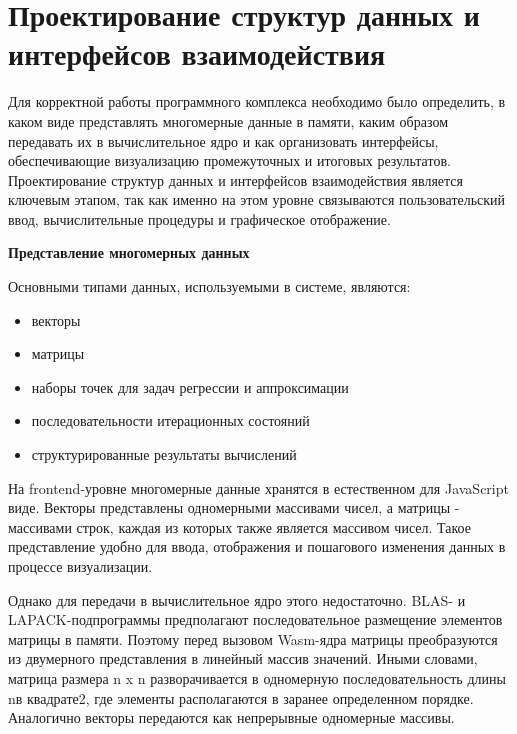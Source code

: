 \documentclass[12pt, oneside]{book}
\begin{document}
\section{Проектирование структур данных и интерфейсов взаимодействия}

    \quad Для корректной работы программного комплекса необходимо было определить, в каком виде представлять многомерные данные в памяти, каким образом передавать их в вычислительное ядро и как организовать интерфейсы, обеспечивающие визуализацию промежуточных и итоговых результатов. Проектирование структур данных и интерфейсов взаимодействия является ключевым этапом, так как именно на этом уровне связываются пользовательский ввод, вычислительные процедуры и графическое отображение.

    \vspace{0.5em}

    \textbf{\large Представление многомерных данных}

    \vspace{0.5em}

    
    \quad Основными типами данных, используемыми в системе, являются:
    
    \begin{itemize}
        \item векторы
        \item матрицы
        \item наборы точек для задач регрессии и аппроксимации
        \item последовательности итерационных состояний
        \item структурированные результаты вычислений
    \end{itemize}

    \quad На frontend-уровне многомерные данные хранятся в естественном для JavaScript виде. Векторы представлены одномерными массивами чисел, а матрицы - массивами строк, каждая из которых также является массивом чисел. Такое представление удобно для ввода, отображения и пошагового изменения данных в процессе визуализации.

    \quad Однако для передачи в вычислительное ядро этого недостаточно. BLAS- и LAPACK-подпрограммы предполагают последовательное размещение элементов матрицы в памяти. Поэтому перед вызовом Wasm-ядра матрицы преобразуются из двумерного представления в линейный массив значений. Иными словами, матрица размера n x n разворачивается в одномерную последовательность длины nв квадрате2, где элементы располагаются в заранее определенном порядке. Аналогично векторы передаются как непрерывные одномерные массивы.
\end{document}
